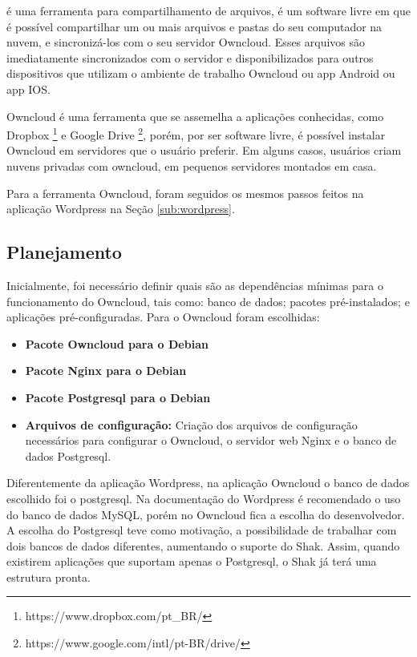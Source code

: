  é uma ferramenta para compartilhamento de arquivos, é um software 
livre em que é possível compartilhar
um ou mais arquivos e pastas do seu computador na nuvem, e sincronizá-los com o seu
servidor Owncloud. Esses arquivos são imediatamente sincronizados com o servidor
e disponibilizados para outros dispositivos que utilizam o ambiente de trabalho
Owncloud ou app Android ou app IOS.

Owncloud é uma ferramenta que se assemelha a aplicações conhecidas, como Dropbox
\footnote{https://www.dropbox.com/pt\_BR/} e Google Drive \footnote{https://www.google.com/intl/pt-BR/drive/}, porém, por ser software livre, é possível instalar Owncloud em servidores
que o usuário preferir. Em alguns casos, usuários criam nuvens privadas com 
owncloud, em pequenos servidores montados em casa.

Para a ferramenta Owncloud, foram seguidos os mesmos passos feitos na aplicação
Wordpress na Seção 
\ref{sub:wordpress}.

\subsection{Planejamento}

Inicialmente, foi necessário definir quais são as dependências
mínimas para o funcionamento do Owncloud, tais como: banco de dados; pacotes
pré-instalados; e aplicações pré-configuradas. Para o Owncloud foram escolhidas:

\begin{itemize}
   \item \textbf{Pacote Owncloud para o Debian}
   \item \textbf{Pacote Nginx para o Debian}
   \item \textbf{Pacote Postgresql para o Debian}
   \item \textbf{Arquivos de configuração:} Criação dos arquivos de configuração
   necessários para configurar o Owncloud, o servidor web Nginx e o banco de dados
   Postgresql.
\end{itemize}

Diferentemente da aplicação Wordpress, na aplicação Owncloud o 
banco de dados escolhido foi o postgresql. Na documentação do Wordpress é recomendado
o uso do banco de dados MySQL, porém no Owncloud fica a escolha do desenvolvedor.
A escolha do Postgresql teve como motivação, a possibilidade de trabalhar com dois bancos de
dados diferentes, aumentando o suporte do Shak. Assim, quando existirem aplicações
que suportam apenas o Postgresql, o Shak já terá uma estrutura pronta.

